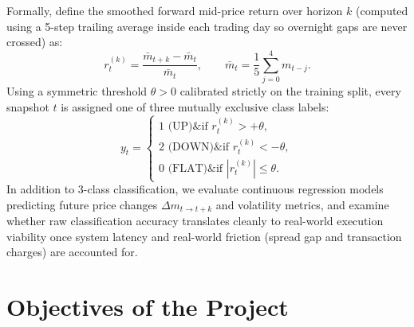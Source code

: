 \documentclass[12pt,a4paper,oneside]{report}
\begin{document}
Formally, define the smoothed forward mid-price return over horizon $k$ (computed using a 5-step trailing average inside each trading day so overnight gaps are never crossed) as:
\begin{equation}
  r_t^{(k)} = \frac{\bar{m}_{t+k} - \bar{m}_t}{\bar{m}_t}, \qquad \bar{m}_t = \frac{1}{5}\sum_{j=0}^{4} m_{t-j}.
\end{equation}
Using a symmetric threshold $\theta > 0$ calibrated strictly on the training split, every snapshot $t$ is assigned one of three mutually exclusive class labels:
\begin{equation}
  y_t = \begin{cases}
    1 \text{ (UP)} \& \text{if } r_t^{(k)} > +\theta, \\
    2 \text{ (DOWN)} \& \text{if } r_t^{(k)} < -\theta, \\
    0 \text{ (FLAT)} \& \text{if } |r_t^{(k)}| \le \theta.
  \end{cases}
\end{equation}
In addition to 3-class classification, we evaluate continuous regression models predicting future price changes $\Delta m_{t\to t+k}$ and volatility metrics, and examine whether raw classification accuracy translates cleanly to real-world execution viability once system latency and real-world friction (spread gap and transaction charges) are accounted for.

\section{Objectives of the Project}
\end{document}
